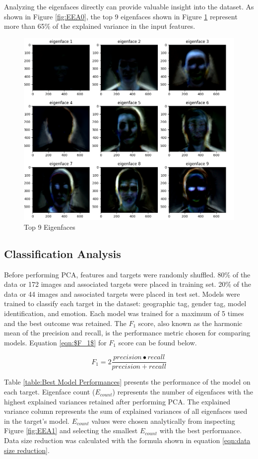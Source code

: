 \documentclass[journal]{new-aiaa}
\begin{document}
Analyzing the eigenfaces directly can provide valuable insight into the dataset.
As shown in Figure \ref{fig:EEA0}, the top 9 eigenfaces shown in Figure \ref{fig:Top 9} represent more than 65\% of the explained variance in the input features.

\begin{figure}[H]
  \centering
  \includegraphics[width=.8\textwidth]{figures/top_9_eigenfaces.png}
  \caption{Top 9 Eigenfaces}
  \label{fig:Top 9}
\end{figure}

\subsection{Classification Analysis}\label{sec:Analysis:Classification Analysis}
Before performing PCA, features and targets were randomly shuffled.
80\% of the data or 172 images and associated targets were placed in training set.
20\% of the data or 44 images and associated targets were placed in test set.
Models were trained to classify each target in the dataset: geographic tag, gender tag, model identification, and emotion.
Each model was trained for a maximum of 5 times and the best outcome was retained.
The $F_1$ score, also known as the harmonic mean of the precision and recall, is the performance metric chosen for comparing models.
Equation \ref{eqn:$F_1$} for $F_1$ score can be found below.

\begin{equation}\label{eqn:$F_1$}
  F_1=2\frac{precision \bullet  recall}{precision + recall}
\end{equation}

Table \ref{table:Best Model Performances} presents the performance of the model on each target.
Eigenface count ($E_{count}$) represents the number of eigenfaces with the highest explained variances retained after performing PCA.
The explained variance column represents the sum of explained variances of all eigenfaces used in the target's model.
$E_{count}$ values were chosen analytically from inspecting Figure \ref{fig:EEA1} and selecting the smallest $E_{count}$ with the best performance.
Data size reduction was calculated with the formula shown in equation \ref{eqn:data size reduction}.
\end{document}
